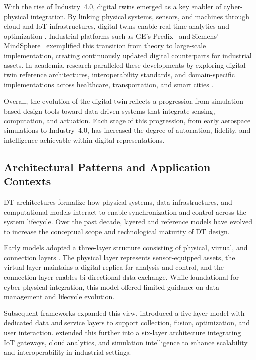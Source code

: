 With the rise of Industry~4.0, digital twins emerged as a key enabler of cyber-physical integration. By linking physical systems, sensors, and machines through cloud and IoT infrastructures, digital twins enable real-time analytics and optimization \cite{liu2021review}. Industrial platforms such as GE’s Predix~\cite{gepredixoverview} and Siemens’ MindSphere~\cite{siemensmindsphere} exemplified this transition from theory to large-scale implementation, creating continuously updated digital counterparts for industrial assets. In academia, research paralleled these developments by exploring digital twin reference architectures, interoperability standards, and domain-specific implementations across healthcare, transportation, and smart cities \cite{barricelli2019survey, botin2022digital}.

Overall, the evolution of the digital twin reflects a progression from simulation-based design tools toward data-driven systems that integrate sensing, computation, and actuation. Each stage of this progression, from early aerospace simulations to Industry~4.0, has increased the degree of automation, fidelity, and intelligence achievable within digital representations.



\subsection{Architectural Patterns and Application Contexts}
\label{subsec:background-dt-architectures-applications}
DT architectures formalize how physical systems, data infrastructures, and computational models interact to enable synchronization and control across the system lifecycle. Over the past decade, layered and reference models have evolved to increase the conceptual scope and technological maturity of DT design.

Early models adopted a three-layer structure consisting of physical, virtual, and connection layers \cite{tao2018digital}. The physical layer represents sensor-equipped assets, the virtual layer maintains a digital replica for analysis and control, and the connection layer enables bi-directional data exchange. While foundational for cyber-physical integration, this model offered limited guidance on data management and lifecycle evolution.

Subsequent frameworks expanded this view. \citet{tao2019digital} introduced a five-layer model with dedicated data and service layers to support collection, fusion, optimization, and user interaction. \citet{redelinghuys2020six} extended this further into a six-layer architecture integrating IoT gateways, cloud analytics, and simulation intelligence to enhance scalability and interoperability in industrial settings.

